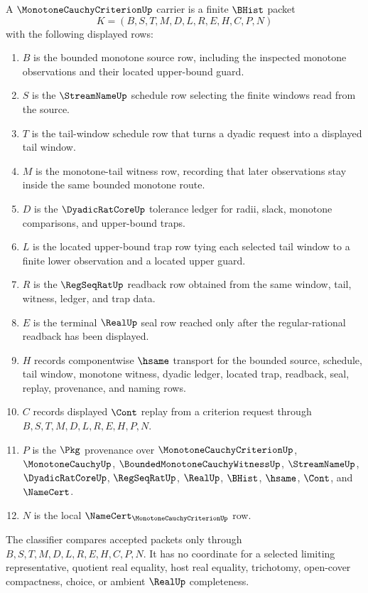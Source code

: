 \begin{definition}
\label{def:monotone-cauchy-criterion-carrier}
A $\MonotoneCauchyCriterionUp$ carrier is a finite $\BHist$ packet
$$
K=(B,S,T,M,D,L,R,E,H,C,P,N)
$$
with the following displayed rows:
\begin{enumerate}
\item $B$ is the bounded monotone source row, including the inspected monotone observations and their located upper-bound guard.
\item $S$ is the $\StreamNameUp$ schedule row selecting the finite windows read from the source.
\item $T$ is the tail-window schedule row that turns a dyadic request into a displayed tail window.
\item $M$ is the monotone-tail witness row, recording that later observations stay inside the same bounded monotone route.
\item $D$ is the $\DyadicRatCoreUp$ tolerance ledger for radii, slack, monotone comparisons, and upper-bound traps.
\item $L$ is the located upper-bound trap row tying each selected tail window to a finite lower observation and a located upper guard.
\item $R$ is the $\RegSeqRatUp$ readback row obtained from the same window, tail, witness, ledger, and trap data.
\item $E$ is the terminal $\RealUp$ seal row reached only after the regular-rational readback has been displayed.
\item $H$ records componentwise $\hsame$ transport for the bounded source, schedule, tail window, monotone witness, dyadic ledger, located trap, readback, seal, replay, provenance, and naming rows.
\item $C$ records displayed $\Cont$ replay from a criterion request through $B,S,T,M,D,L,R,E,H,P,N$.
\item $P$ is the $\Pkg$ provenance over $\MonotoneCauchyCriterionUp$, $\MonotoneCauchyUp$, $\BoundedMonotoneCauchyWitnessUp$, $\StreamNameUp$, $\DyadicRatCoreUp$, $\RegSeqRatUp$, $\RealUp$, $\BHist$, $\hsame$, $\Cont$, and $\NameCert$.
\item $N$ is the local $\NameCert_{\MonotoneCauchyCriterionUp}$ row.
\end{enumerate}
The classifier compares accepted packets only through $B,S,T,M,D,L,R,E,H,C,P,N$. It has no coordinate for a selected limiting representative, quotient real equality, host real equality, trichotomy, open-cover compactness, choice, or ambient $\RealUp$ completeness.
\end{definition}

